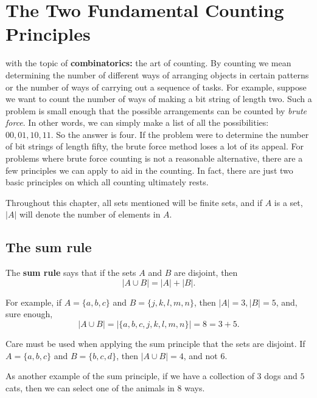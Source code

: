 \chapter{The Two Fundamental Counting Principles}

 with the topic of {\bf combinatorics:} the art of
counting. By counting we mean determining the number of different ways of 
arranging objects in certain patterns or the number of ways of carrying out 
a sequence of tasks. For example, suppose we want to count the number of ways
of making a bit string of length two. Such a problem is small enough that the 
possible arrangements can be counted by {\itshape brute force}. In other words,
we can simply make a list of all the possibilities: $00, 01, 10, 11$. So the answer is
four. If the problem were to determine the number of bit strings of length fifty,
the brute force method loses a lot of its appeal. For problems where brute force
counting is not a reasonable alternative, there are a few principles we can apply
to aid in the counting. In fact, there are just two basic principles on which all
counting ultimately rests.

Throughout this chapter, all sets mentioned will be finite sets, and if $A$ is a set, $|A|$
will denote the number of elements in $A$.

\section{The sum rule}
The {\bfseries sum rule} says that if the sets $A$ and $B$ are disjoint, then
\[
\lvert A\cup B\rvert = \lvert A\rvert+\lvert B\rvert.
\]

\clearpage
\begin{exmp}
 For example, if $A=\{a,b,c\}$ and $B=\{j,k,l,m,n\}$, then $\lvert A\rvert=3, \lvert B\rvert=5$, and, sure
 enough, 
 \[
 \lvert A\cup B\rvert = \lvert \{a,b,c,j,k,l,m,n\}\rvert = 8 = 3+5.
 \]
\end{exmp}

Care must be used when\marginnote{\dbend}
applying the sum principle that the sets are disjoint. If $A=\{a,b,c\}$ and $B=\{b,c,d\}$,
then $\lvert A\cup B \rvert = 4$, and not $6$.

\begin{exmp}
 As another example of the sum principle, if we have a collection of $3$ dogs and $5$ cats,
 then we can select one of the animals in $8$ ways.
\end{exmp}

